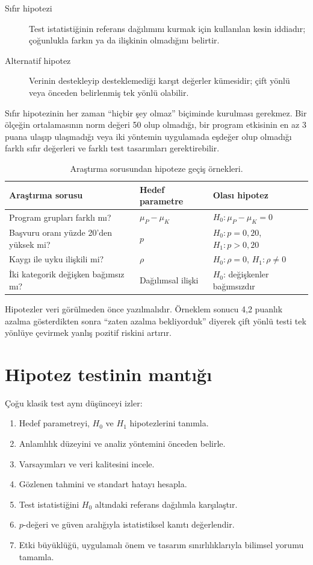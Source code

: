 \begin{description}
  \item[Sıfır hipotezi] Test istatistiğinin referans dağılımını kurmak için kullanılan kesin iddiadır; çoğunlukla farkın ya da ilişkinin olmadığını belirtir.
  \item[Alternatif hipotez] Verinin destekleyip desteklemediği karşıt değerler kümesidir; çift yönlü veya önceden belirlenmiş tek yönlü olabilir.
\end{description}

Sıfır hipotezinin her zaman ``hiçbir şey olmaz'' biçiminde kurulması gerekmez.
Bir ölçeğin ortalamasının norm değeri 50 olup olmadığı, bir program etkisinin
en az 3 puana ulaşıp ulaşmadığı veya iki yöntemin uygulamada eşdeğer olup
olmadığı farklı sıfır değerleri ve farklı test tasarımları gerektirebilir.

\begin{table}[htbp]
\centering
\caption{Araştırma sorusundan hipoteze geçiş örnekleri.}
\begin{tabular}{@{}p{}p{}p{}@{}}
\toprule
Araştırma sorusu & Hedef parametre & Olası hipotez \\
\midrule
Program grupları farklı mı? & $\mu_P-\mu_K$ & $H_0:\mu_P-\mu_K=0$ \\
Başvuru oranı yüzde 20'den yüksek mi? & $p$ & $H_0:p=0{,}20$, $H_1:p>0{,}20$ \\
Kaygı ile uyku ilişkili mi? & $\rho$ & $H_0:\rho=0$, $H_1:\rho\neq0$ \\
İki kategorik değişken bağımsız mı? & Dağılımsal ilişki & $H_0$: değişkenler bağımsızdır \\
\bottomrule
\end{tabular}
\end{table}

Hipotezler veri görülmeden önce yazılmalıdır. Örneklem sonucu 4,2 puanlık
azalma gösterdikten sonra ``zaten azalma bekliyorduk'' diyerek çift yönlü
testi tek yönlüye çevirmek yanlış pozitif riskini artırır.

\section{Hipotez testinin mantığı}

Çoğu klasik test aynı düşünceyi izler:

\begin{enumerate}
  \item Hedef parametreyi, $H_0$ ve $H_1$ hipotezlerini tanımla.
  \item Anlamlılık düzeyini ve analiz yöntemini önceden belirle.
  \item Varsayımları ve veri kalitesini incele.
  \item Gözlenen tahmini ve standart hatayı hesapla.
  \item Test istatistiğini $H_0$ altındaki referans dağılımla karşılaştır.
  \item $p$-değeri ve güven aralığıyla istatistiksel kanıtı değerlendir.
  \item Etki büyüklüğü, uygulamalı önem ve tasarım sınırlılıklarıyla bilimsel yorumu tamamla.
\end{enumerate}

